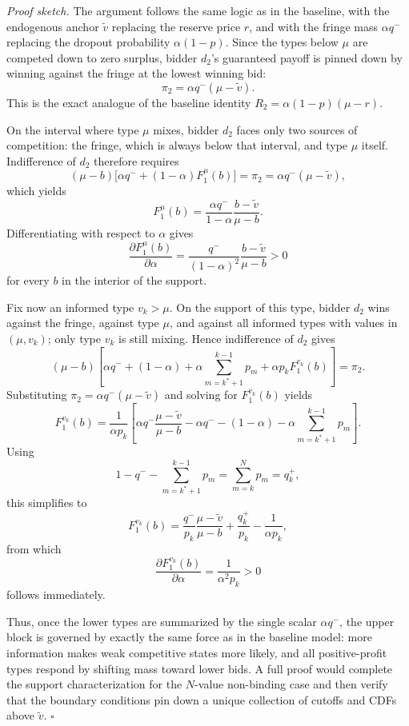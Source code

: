 \noindent \emph{Proof sketch.} The argument follows the same logic as in the baseline, with the endogenous anchor $\tilde{v}$ replacing the reserve price $r$, and with the fringe mass $\alpha q^-$ replacing the dropout probability $\alpha(1-p)$. Since the types below $\mu$ are competed down to zero surplus, bidder $d_2$'s guaranteed payoff is pinned down by winning against the fringe at the lowest winning bid:
\[
\pi_2 = \alpha q^- (\mu-\tilde{v}).
\]
This is the exact analogue of the baseline identity $R_2 = \alpha(1-p)(\mu-r)$.

\noindent On the interval where type $\mu$ mixes, bidder $d_2$ faces only two sources of competition: the fringe, which is always below that interval, and type $\mu$ itself. Indifference of $d_2$ therefore requires
\[
(\mu-b)\big[\alpha q^- + (1-\alpha)F_1^{\mu}(b)\big] = \pi_2 = \alpha q^- (\mu-\tilde{v}),
\]
which yields
\[
F_1^{\mu}(b) = \frac{\alpha q^-}{1-\alpha}\frac{b-\tilde{v}}{\mu-b}.
\]
Differentiating with respect to $\alpha$ gives
\[
\frac{\partial F_1^{\mu}(b)}{\partial \alpha} = \frac{q^-}{(1-\alpha)^2}\frac{b-\tilde{v}}{\mu-b} > 0
\]
for every $b$ in the interior of the support.

\noindent Fix now an informed type $v_k > \mu$. On the support of this type, bidder $d_2$ wins against the fringe, against type $\mu$, and against all informed types with values in $(\mu, v_k)$; only type $v_k$ is still mixing. Hence indifference of $d_2$ gives
\[
(\mu-b)\left[\alpha q^- + (1-\alpha) + \alpha \sum_{m=k^*+1}^{k-1} p_m + \alpha p_k F_1^{v_k}(b)\right] = \pi_2.
\]
Substituting $\pi_2 = \alpha q^- (\mu-\tilde{v})$ and solving for $F_1^{v_k}(b)$ yields
\[
F_1^{v_k}(b) = \frac{1}{\alpha p_k}\left[\alpha q^- \frac{\mu-\tilde{v}}{\mu-b} - \alpha q^- - (1-\alpha) - \alpha \sum_{m=k^*+1}^{k-1} p_m\right].
\]
Using
\[
1 - q^- - \sum_{m=k^*+1}^{k-1} p_m = \sum_{m=k}^{N} p_m = q_k^+,
\]
this simplifies to
\[
F_1^{v_k}(b) = \frac{q^-}{p_k}\frac{\mu-\tilde{v}}{\mu-b} + \frac{q_k^+}{p_k} - \frac{1}{\alpha p_k},
\]
from which
\[
\frac{\partial F_1^{v_k}(b)}{\partial \alpha} = \frac{1}{\alpha^2 p_k} > 0
\]
follows immediately.

\noindent Thus, once the lower types are summarized by the single scalar $\alpha q^-$, the upper block is governed by exactly the same force as in the baseline model: more information makes weak competitive states more likely, and all positive-profit types respond by shifting mass toward lower bids. A full proof would complete the support characterization for the $N$-value non-binding case and then verify that the boundary conditions pin down a unique collection of cutoffs and CDFs above $\tilde{v}$. \hfill $\square$

